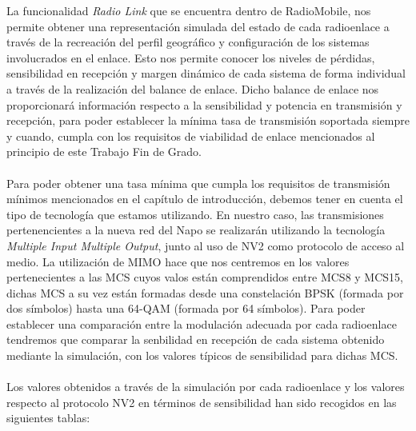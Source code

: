 	La funcionalidad \textit{Radio Link} que se encuentra dentro de RadioMobile, nos permite obtener una representación simulada del estado de cada radioenlace a través de la recreación del perfil geográfico y configuración de los sistemas involucrados en el enlace. Esto nos permite conocer los niveles de pérdidas, sensibilidad en recepción y margen dinámico de cada sistema de forma individual a través de la realización del balance de enlace. Dicho balance de enlace nos proporcionará información respecto a la sensibilidad y potencia en transmisión y recepción, para poder establecer la mínima tasa de transmisión soportada siempre y cuando, cumpla con los requisitos de viabilidad de enlace mencionados al principio de este Trabajo Fin de Grado.\\\\
	
	Para poder obtener una tasa mínima que cumpla los requisitos de transmisión mínimos mencionados en el capítulo de introducción, debemos tener en cuenta el tipo de tecnología que estamos utilizando. En nuestro caso, las transmisiones pertenencientes a la nueva red del Napo se realizarán utilizando la tecnología \textit{Multiple Input Multiple Output}, junto al uso de NV2 como protocolo de acceso al medio. La utilización de MIMO hace que nos centremos en los valores pertenecientes a las MCS cuyos valos están comprendidos entre MCS8 y MCS15, dichas MCS a su vez están formadas desde una constelación BPSK (formada por dos símbolos) hasta una 64-QAM (formada por 64 símbolos). Para poder establecer una comparación entre la modulación adecuada por cada radioenlace tendremos que comparar la senbilidad en recepción de cada sistema obtenido mediante la simulación, con los valores típicos de sensibilidad para dichas MCS.\\\\
	
	Los valores obtenidos a través de la simulación por cada radioenlace y los valores respecto al protocolo NV2 en términos de sensibilidad han sido recogidos en las siguientes tablas:\\\\
	
